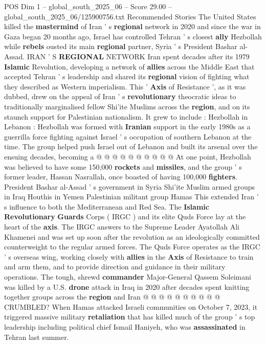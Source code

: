 \begin{textsample}{POS Dim 1 – global\_south\_2025\_06 – Score 29.00 – global\_south\_2025\_06/125900756.txt}  \label{ex:f1_pos_212}
Recommended Stories The United States killed the \textbf{mastermind} of Iran ' s \textbf{regional} network in 2020 and since the war in Gaza began 20 months ago, Israel has controlled Tehran ' s closest \textbf{ally} Hezbollah while \textbf{rebels} ousted its main \textbf{regional} partner, Syria ' s President Bashar al-Assad.
IRAN ' S \textbf{REGIONAL} NETWORK Iran spent decades after its 1979 \textbf{Islamic} Revolution, developing a network of \textbf{allies} across the Middle East that accepted Tehran ' s leadership and shared its \textbf{regional} vision of fighting what they described as Western imperialism.
This ' \textbf{Axis} of Resistance ', as it was dubbed, drew on the appeal of Iran ' s \textbf{revolutionary} theocratic ideas to traditionally marginalised fellow Shi'ite Muslims across the \textbf{region}, and on its staunch support for Palestinian nationalism.
It grew to include : Hezbollah in Lebanon : Hezbollah was formed with \textbf{Iranian} support in the early 1980s as a guerrilla force fighting against Israel ' s occupation of southern Lebanon at the time.
The group helped push Israel out of Lebanon and built its arsenal over the ensuing decades, becoming a @ @ @ @ @ @ @ @ @ @ At one point, Hezbollah was believed to have some 150,000 \textbf{rockets} and \textbf{missiles}, and the group ' s former leader, Hassan Nasrallah, once boasted of having 100,000 \textbf{fighters}.
President Bashar al-Assad ' s government in Syria Shi'ite Muslim armed groups in Iraq Houthis in Yemen Palestinian militant group Hamas This extended Iran ' s influence to both the Mediterranean and Red Sea.
The \textbf{Islamic} \textbf{Revolutionary} \textbf{Guards} Corps ( IRGC ) and its elite Quds Force lay at the heart of the \textbf{axis}.
The IRGC answers to the Supreme Leader Ayatollah Ali Khamenei and was set up soon after the revolution as an ideologically committed counterweight to the regular armed forces.
The Quds Force operates as the IRGC ' s overseas wing, working closely with \textbf{allies} in the \textbf{Axis} of Resistance to train and arm them, and to provide direction and guidance in their military operations.
The tough, shrewd \textbf{commander} Major-General Qassem Soleimani was killed by a U.S. \textbf{drone} attack in Iraq in 2020 after decades spent knitting together groups across the \textbf{region} and Iran @ @ @ @ @ @ @ @ @ @ CRUMBLED?
When Hamas attacked Israeli communities on October 7, 2023, it triggered massive military \textbf{retaliation} that has killed much of the group ' s top leadership including political chief Ismail Haniyeh, who was \textbf{assassinated} in Tehran last summer.

\end{textsample}
